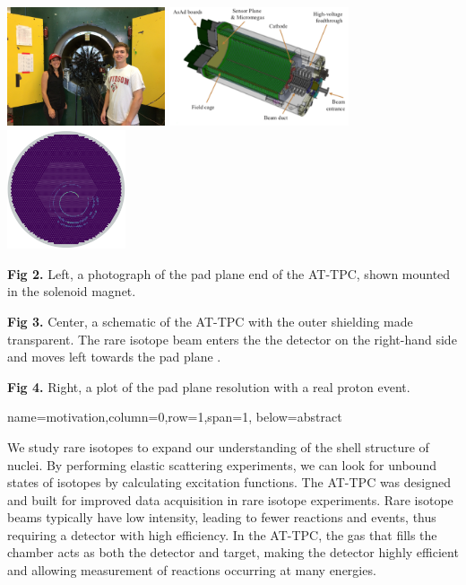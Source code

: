 \documentclass[ansiepaperDNP,portrait]{baposterDNP}
\begin{document}
\begin{poster}
{\begin{center}
\includegraphics [height=35mm]{michigan_trip.jpg} 
\hspace{0.5cm}
\includegraphics [height=35mm] {attpc.png}
\hspace{0.5cm}
\includegraphics [height=35mm] {padplane.png}
\end{center}
\vspace{-1em}

\small{\textbf{Fig 2.} Left, a photograph of the pad plane end of the AT-TPC, shown mounted in the solenoid magnet.}

\small{\textbf{Fig 3.} Center, a schematic of the AT-TPC with the outer shielding made transparent. The rare isotope beam enters the the detector on the right-hand side and moves left towards the pad plane \cite{Bradt-thesis}.}

\small{\textbf{Fig 4.} Right, a plot of the pad plane resolution with a real proton event.}

}
{name=motivation,column=0,row=1,span=1, below=abstract}
{\small{We study rare isotopes to expand our understanding of the shell structure of nuclei. By performing elastic scattering experiments, we can look for unbound states of isotopes by calculating excitation functions. The AT-TPC was designed and built for improved data acquisition in rare isotope experiments. Rare isotope beams typically have low intensity, leading to fewer reactions and events, thus requiring a detector with high efficiency. In the AT-TPC, the gas that fills the chamber acts as both the detector and target, making the detector highly efficient and allowing measurement of reactions occurring at many energies. %

}}
\end{poster}
\end{document}
